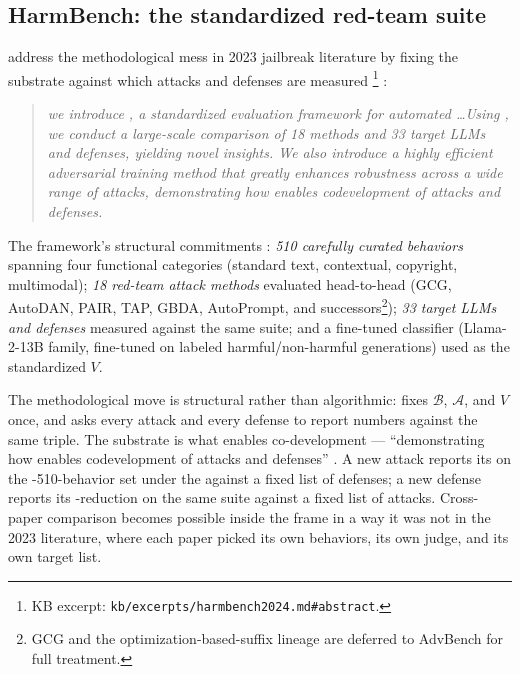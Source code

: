 \subsection{HarmBench: the standardized red-team suite}
\label{sec:safety-harmbench}

\citet{harmbench2024} address the methodological mess in 2023
jailbreak literature by fixing the substrate against which attacks
and defenses are measured%
\footnote{KB excerpt: \nolinkurl{kb/excerpts/harmbench2024.md#abstract}.}
\citep[\S{}abstract]{harmbench2024}:

\begin{quote}\itshape
we introduce , a standardized evaluation framework for
automated \ldots Using , we conduct a
large-scale comparison of 18  methods and 33 target
LLMs and defenses, yielding novel insights. We also introduce a
highly efficient adversarial training method that greatly enhances
 robustness across a wide range of attacks, demonstrating how
 enables codevelopment of attacks and defenses.
\end{quote}

The framework's structural commitments
\citep[\S{}sec-structure]{harmbench2024}: \emph{510 carefully
curated behaviors} spanning four functional categories (standard
text, contextual, copyright, multimodal); \emph{18 red-team attack
methods} evaluated head-to-head (GCG, AutoDAN, PAIR, TAP, GBDA,
AutoPrompt, and successors\footnote{GCG and the
optimization-based-suffix lineage are deferred to AdvBench
 for full
treatment.}); \emph{33 target LLMs and defenses} measured against
the same suite; and a fine-tuned \emph{} classifier
(Llama-2-13B family, fine-tuned on labeled harmful/non-harmful
generations) used as the standardized $V$.

The methodological move is structural rather than algorithmic:
 fixes $\mathcal{B}$, $\mathcal{A}$, and $V$ once, and
asks every attack and every defense to report numbers against the
same triple. The substrate is what enables co-development ---
``demonstrating how  enables codevelopment of attacks and
defenses''
\citep[\S{}abstract]{harmbench2024}. A new attack reports its
 on the -510-behavior set under the
 against a fixed list of defenses; a new defense
reports its -reduction on the same suite against a fixed list
of attacks. Cross-paper comparison becomes possible inside the
 frame in a way it was not in the 2023 literature, where
each paper picked its own behaviors, its own judge, and its own
target list.

